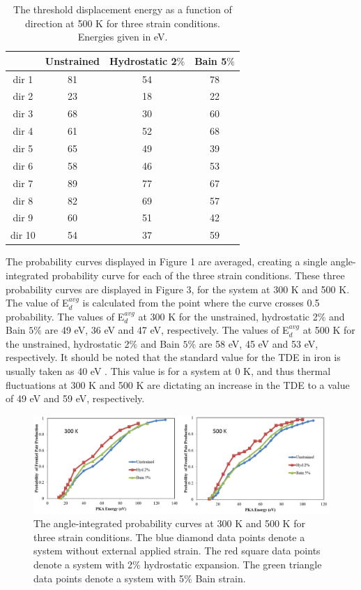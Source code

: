 \documentclass[review]{elsarticle}
\begin{document}
\begin{table}[htbp]
\caption{The threshold displacement energy as a function of direction at 500 K for three strain conditions.  Energies given in eV.}
\begin{center}
\begin{tabular}{|c|c|c|c|}
	\hline
	& Unstrained & Hydrostatic 2$\%$ & Bain 5$\%$ \\
	 \hline
	 dir 1 & 81 & 54 & 78 \\
	 dir 2 & 23 & 18 & 22 \\
	 dir 3 & 68 & 30 & 60 \\
	 dir 4 & 61 & 52 & 68 \\
	 dir 5 & 65 & 49 & 39 \\
	 dir 6 & 58 & 46 & 53 \\
	 dir 7 & 89 & 77 & 67 \\
	 dir 8 & 82 & 69 & 57 \\
	 dir 9 & 60 & 51 & 42 \\
	 dir 10 & 54 & 37 & 59 \\
	 \hline
\end{tabular}
\end{center}
\label{default}
\end{table}%

\FloatBarrier

The probability curves displayed in Figure 1 are averaged, creating a single angle-integrated probability curve for each of the three strain conditions.  These three probability curves are displayed in Figure 3, for the system at 300 K and 500 K.  The value of E$^{avg}_{d}$ is calculated from the point where the curve crosses 0.5 probability.  The values of E$^{avg}_{d}$ at 300 K for the unstrained, hydrostatic 2$\%$ and Bain $5\%$ are 49 eV, 36 eV and 47 eV, respectively.  The values of E$^{avg}_{d}$ at 500 K for the unstrained, hydrostatic 2$\%$ and Bain $5\%$ are 58 eV, 45 eV and 53 eV, respectively.  It should be noted that the standard value for the TDE in iron is usually taken as 40 eV \cite{was2007}.  This value is for a system at 0 K, and thus thermal fluctuations at 300 K and 500 K are dictating an increase in the TDE to a value of 49 eV and 59 eV, respectively.

\begin{figure}[hp]
   \centering
   \includegraphics[width=\textwidth]{pp_curves.png} %
   \caption{The angle-integrated probability curves at 300 K and 500 K for three strain conditions.  The blue diamond data points denote a system without external applied strain.  The red square data points denote a system with 2$\%$ hydrostatic expansion. The green triangle data points denote a system with 5$\%$ Bain strain.}
   \label{fig:example}
\end{figure}
\end{document}
